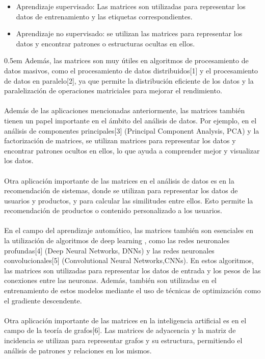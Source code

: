 \documentclass{article}
\theoremstyle{mytheoremstyle}
\theoremstyle{mytheoremstyle}
\theoremstyle{myproblemstyle}
\begin{document}
\begin{itemize}
    \item Aprendizaje supervisado: Las matrices son utilizadas para representar los datos de entrenamiento y las etiquetas correspondientes.
    \item Aprendizaje no supervisado: se utilizan las matrices para representar los datos y encontrar patrones o estructuras ocultas en ellos.
\end{itemize}
\parskip 0.5em
Además, las matrices son muy útiles en algoritmos de procesamiento de datos masivos, como el procesamiento de datos distribuidos[1] y el procesamiento de datos en paralelo[2], ya que permite la distribución eficiente de los datos y la paralelización de operaciones matriciales para mejorar el rendimiento.
\\
\\
Además de las aplicaciones mencionadas anteriormente, las matrices también tienen un papel importante en el ámbito del análisis de datos. Por ejemplo, en el análisis de componentes principales[3] (Principal Component Analysis, PCA) y la factorización de matrices, se utilizan matrices para representar los datos y encontrar patrones ocultos en ellos, lo que ayuda a comprender mejor y visualizar los datos.
\\
\\
Otra aplicación importante de las matrices en el análisis de datos es en la recomendación de sistemas, donde se utilizan para representar los datos de usuarios y productos, y para calcular las similitudes entre ellos. Esto permite la recomendación de productos o contenido personalizado a los usuarios.
\\
\\
En el campo del aprendizaje automático, las matrices también son esenciales en la utilización de algoritmos de deep learning , como las redes neuronales profundas[4] (Deep Neural Networks, DNNs) y las redes neuronales convolucionales[5] (Convolutional Neural Networks,CNNs). En estos algoritmos, las matrices son utilizadas para representar los datos de entrada y los pesos de las conexiones entre las neuronas. Además, también son utilizadas en el entrenamiento de estos modelos mediante el uso de técnicas de optimización como el gradiente descendente.
\\
\\
Otra aplicación importante de las matrices en la inteligencia artificial es en el campo de la teoría de grafos[6]. Las matrices de adyacencia y la matriz de incidencia se utilizan para representar grafos y su estructura, permitiendo el análisis de patrones y relaciones en los mismos.
\end{document}
